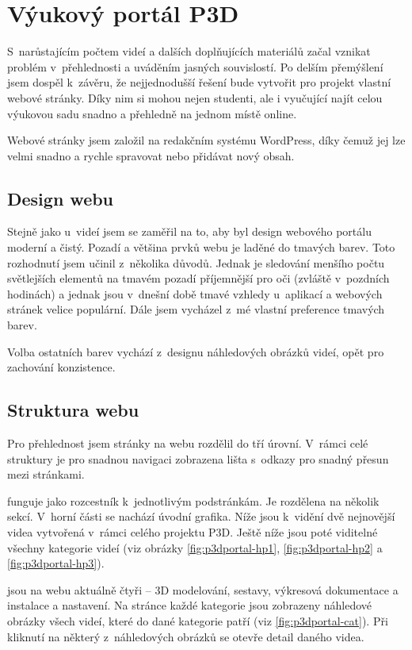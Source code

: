 \section{Výukový portál P3D}
S~narůstajícím počtem videí a dalších doplňujících materiálů začal vznikat problém v~přehlednosti a uváděním jasných souvislostí.
Po delším přemýšlení jsem dospěl k~závěru, že nejjednodušší řešení bude vytvořit pro projekt vlastní webové stránky.
Díky nim si mohou nejen studenti, ale i vyučující najít celou výukovou sadu snadno a přehledně na jednom místě online.

Webové stránky jsem založil na redakčním systému WordPress, díky čemuž jej lze velmi snadno a rychle spravovat nebo přidávat nový obsah.

\subsection{Design webu}
Stejně jako u~videí jsem se zaměřil na to, aby byl design webového portálu moderní a čistý.
Pozadí a většina prvků webu je laděné do tmavých barev.
Toto rozhodnutí jsem učinil z~několika důvodů.
Jednak je sledování menšího počtu světlejších elementů na tmavém pozadí příjemnější pro oči (zvláště v~pozdních hodinách) a jednak jsou v~dnešní době tmavé vzhledy u~aplikací a webových stránek velice populární.
Dále jsem vycházel z~mé vlastní preference tmavých barev.

Volba ostatních barev vychází z~designu náhledových obrázků videí, opět pro zachování konzistence.

\subsection{Struktura webu}
Pro přehlednost jsem stránky na webu rozdělil do tří úrovní. 
V~rámci celé struktury je pro snadnou navigaci zobrazena lišta s~odkazy pro snadný přesun mezi stránkami.

\noindent{} funguje jako rozcestník k~jednotlivým podstránkám. Je rozdělena na několik sekcí. V~horní části se nachází úvodní grafika. Níže jsou k~vidění dvě nejnovější videa vytvořená v~rámci celého projektu P3D. Ještě níže jsou poté viditelné všechny kategorie videí (viz obrázky \ref{fig:p3dportal-hp1}, \ref{fig:p3dportal-hp2} a \ref{fig:p3dportal-hp3}).

\noindent{} jsou na webu aktuálně čtyři -- 3D modelování, sestavy, výkresová dokumentace a instalace a nastavení. Na stránce každé kategorie jsou zobrazeny náhledové obrázky všech videí, které do dané kategorie patří (viz \autoref{fig:p3dportal-cat}).
Při kliknutí na některý z~náhledových obrázků se otevře detail daného videa. 

